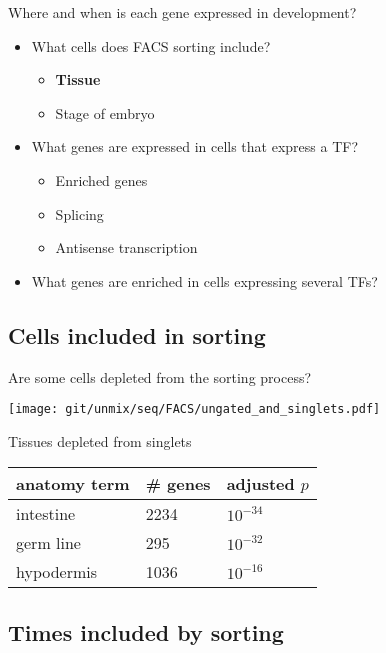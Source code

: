 \documentclass[serif,9pt]{beamer}
\begin{document}
\begin{frame}{Where and when is each gene expressed in development?}
\begin{itemize}
\item What cells does FACS sorting include?
\begin{itemize}
\item {\bf Tissue}
\item Stage of embryo
\end{itemize}
\item What genes are expressed in cells that express a TF?
\begin{itemize}
\item Enriched genes
\item Splicing
\item Antisense transcription
\end{itemize}
\item What genes are enriched in cells expressing several TFs?
\end{itemize}
\end{frame}

\subsection{Cells included in sorting}

\begin{frame}{Are some cells depleted from the sorting process?}

\begin{minipage}{0.58\textwidth}
\texttt{[image: git/unmix/seq/FACS/ungated\_and\_singlets.pdf]}
\end{minipage}
\pause
\begin{minipage}{0.4\textwidth}
Tissues depleted from singlets
\begin{table}[!tbp]\scriptsize
\begin{tabular}{lll}
anatomy term & \# genes & adjusted $p$ \\
\hline
intestine & 2234 & $10^{-34}$ \\
germ line & 295 & $10^{-32}$ \\
hypodermis & 1036 & $10^{-16}$ \\
\end{tabular}
\end{table}
\end{minipage}

\end{frame}

\subsection{Times included by sorting}
\end{document}
